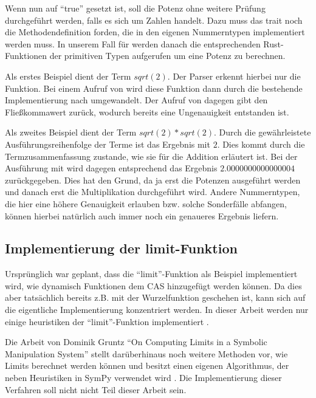 \documentclass[11pt,a4paper, ngerman]{article}
\begin{document}
Wenn nun  auf ``true'' gesetzt ist, soll die Potenz ohne weitere Prüfung durchgeführt werden, falls es sich um Zahlen handelt. Dazu muss das trait  noch die Methodendefinition  forden, die in den eigenen Nummerntypen implementiert werden muss. In unserem Fall für  werden danach die entsprechenden Rust-Funktionen der primitiven Typen aufgerufen um eine Potenz zu berechnen.

Als erstes Beispiel dient der Term $sqrt(2)$. Der Parser erkennt hierbei nur die Funktion. Bei einem Aufruf von  wird diese Funktion dann durch die bestehende Implementierung nach  umgewandelt. Der Aufruf von  dagegen gibt den Fließkommawert  zurück, wodurch bereits eine Ungenauigkeit entstanden ist.

Als zweites Beispiel dient der Term $sqrt(2)*sqrt(2)$. Durch die gewährleistete Ausführungsreihenfolge der Terme ist das Ergebnis mit  $2$. Dies kommt durch die Termzusammenfassung zustande, wie sie für die Addition erläutert ist. Bei der Ausführung mit  wird dagegen entsprechend das Ergebnis $2.0000000000000004$ zurückgegeben. Dies hat den Grund, da ja erst die Potenzen ausgeführt werden und danach erst die Multiplikation durchgeführt wird. Andere Nummerntypen, die hier eine höhere Genauigkeit erlauben bzw. solche Sonderfälle abfangen, können hierbei natürlich auch immer noch ein genaueres Ergebnis liefern.

\subsection{Implementierung der limit-Funktion}
Ursprünglich war geplant, dass die ``limit''-Funktion als Beispiel implementiert wird, wie dynamisch Funktionen dem CAS hinzugefügt werden können. Da dies aber tatsächlich bereits z.B. mit der Wurzelfunktion geschehen ist, kann sich auf die eigentliche Implementierung konzentriert werden. In dieser Arbeit werden nur einige heuristiken der ``limit''-Funktion implementiert \cite{ListLimitHeuristic}.

Die Arbeit von Dominik Gruntz ``On Computing Limits in a Symbolic Manipulation System'' \cite{GruntzPdf} stellt darüberhinaus noch weitere Methoden vor, wie Limits berechnet werden können und besitzt einen eigenen Algorithmus, der neben Heuristiken in SymPy verwendet wird \cite{SympyLimitNote}. Die Implementierung dieser Verfahren soll nicht nicht Teil dieser Arbeit sein.
\end{document}
